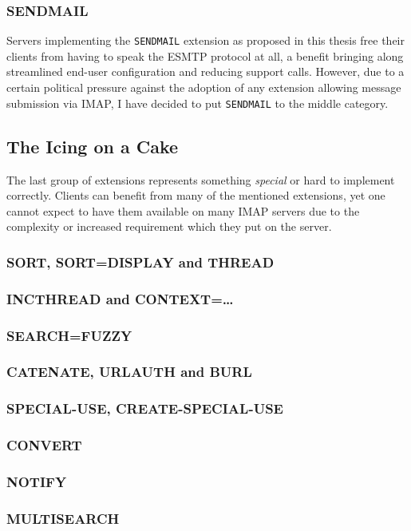 \documentclass[trojita]{subfiles}
\begin{document}
\subsubsection{SENDMAIL}

Servers implementing the {\tt SENDMAIL} extension as proposed in this thesis free their clients from having to speak the
ESMTP protocol at all, a benefit bringing along streamlined end-user configuration and reducing support calls.  However,
due to a certain political pressure against the adoption of any extension allowing message submission via IMAP, I have
decided to put {\tt SENDMAIL} to the middle category.

\subsection{The Icing on a Cake}

The last group of extensions represents something {\em special} or hard to implement correctly.  Clients can benefit
from many of the mentioned extensions, yet one cannot expect to have them available on many IMAP servers due to the
complexity or increased requirement which they put on the server.

\subsubsection{SORT, SORT=DISPLAY and THREAD}

\subsubsection{INCTHREAD and CONTEXT=\ldots}

\subsubsection{SEARCH=FUZZY}

\subsubsection{CATENATE, URLAUTH and BURL}

\subsubsection{SPECIAL-USE, CREATE-SPECIAL-USE}

\subsubsection{CONVERT}

\subsubsection{NOTIFY}

\subsubsection{MULTISEARCH}

\end{document}
